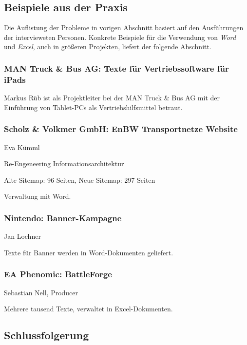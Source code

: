 \subsection{Beispiele aus der Praxis}

Die Auflistung der Probleme in vorigen Abschnitt basiert auf den Ausführungen der intervieweten Personen. Konkrete Beispiele für die Verwendung von \emph{Word} und \emph{Excel}, auch in größeren Projekten, liefert der folgende Abschnitt.


\subsubsection{MAN Truck \& Bus AG: Texte für Vertriebssoftware für iPads}

Markus Rüb ist als Projektleiter bei der MAN Truck \& Bus AG mit der Einführung von Tablet-PCs als Vertriebshilfsmittel betraut.

\subsubsection{Scholz \& Volkmer GmbH: EnBW Transportnetze Website}

Eva Kümml

Re-Engeneering Informationsarchitektur

Alte Sitemap: 96 Seiten, Neue Sitemap: 297 Seiten

Verwaltung mit Word.

\subsubsection{Nintendo: Banner-Kampagne}

Jan Lochner

Texte für Banner werden in Word-Dokumenten geliefert.

\subsubsection{EA Phenomic: BattleForge}

Sebastian Nell, Producer

Mehrere tausend Texte, verwaltet in Excel-Dokumenten.

\subsection{Schlussfolgerung}


